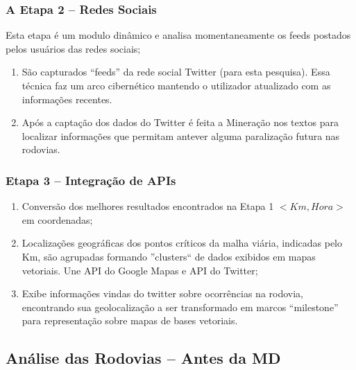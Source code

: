 \documentclass[11pt]{beamer}
\begin{document}
\begin{frame}
	\frametitle{A Etapa 2 -- Redes Sociais}
	Esta etapa é um modulo dinâmico e analisa momentaneamente os feeds postados pelos usuários das redes sociais;
	\pause
 \begin{enumerate}
 	\item São capturados ``feeds'' da rede social Twitter (para esta pesquisa). 
 	Essa técnica faz um arco cibernético mantendo o utilizador atualizado com as informações recentes.
 	\pause
 	\item Após a captação dos dados do Twitter é feita a Mineração nos textos para localizar informações que permitam antever alguma paralização futura nas rodovias. 
 \end{enumerate}
\end{frame}

\begin{frame}
	\frametitle{Etapa 3 -- Integração de APIs}
  \begin{enumerate}
	\item Conversão dos melhores resultados encontrados na Etapa 1 $<Km, Hora>$ em coordenadas;
	\pause
	\item Localizações geográficas dos pontos críticos da malha viária, indicadas pelo Km, são agrupadas formando ''clusters`` de dados exibidos em mapas vetoriais. Une API do Google Mapas e API do Twitter;
	\pause
	\item Exibe informações vindas do twitter sobre ocorrências na rodovia, encontrando sua geolocalização a ser transformado em marcos ``milestone'' para representação sobre mapas de bases vetoriais.
  \end{enumerate}
\end{frame}
\subsection{Análise das Rodovias -- Antes da MD}
\end{document}

